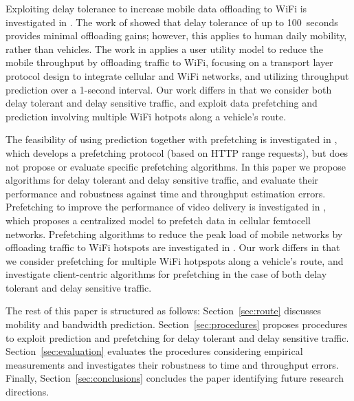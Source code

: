 \documentclass{sig-alternate}
\newcommand{\mynotex}[1]{}
\begin{document}
Exploiting  delay tolerance to increase   mobile data offloading to WiFi  is investigated in \cite{Bal++10}. The work of \cite{Lee++10} showed that delay tolerance of up to 100~seconds  provides minimal offloading gains; however, this applies to human daily mobility, rather than vehicles.
The work in \cite{Hou++11} applies a user utility model to reduce the mobile throughput by offloading traffic to WiFi, focusing on a transport layer protocol design to integrate cellular and WiFi networks, and utilizing throughput prediction over a 1-second  interval.
Our work differs in that we consider both delay tolerant and delay sensitive traffic, and exploit data prefetching and  prediction involving multiple WiFi hotpots along a vehicle's route.

The feasibility of using prediction together with prefetching is investigated in \cite{Des++09}, which  develops  a prefetching protocol (based on HTTP range requests), but does not propose or evaluate specific prefetching algorithms. In this paper we propose algorithms for delay tolerant and delay sensitive traffic, and evaluate their performance and robustness against time and throughput estimation errors.
Prefetching to improve the performance of video delivery  is investigated in \cite{Gol++12}, which proposes a centralized model to prefetch data in cellular femtocell networks. Prefetching algorithms to reduce the peak load of mobile networks by offloading traffic to WiFi hotspots are investigated in \cite{Mal++12}. Our work differs in that we consider prefetching for multiple WiFi hotpspots along a vehicle's route, and investigate client-centric algorithms for prefetching in the case of both delay tolerant and delay sensitive traffic.



The rest of this paper is structured as follows:
Section~\ref{sec:route} discusses mobility and bandwidth prediction.
Section~\ref{sec:procedures} proposes procedures to exploit prediction and prefetching for delay tolerant and delay sensitive traffic. Section~\ref{sec:evaluation} evaluates the procedures considering empirical measurements and investigates their robustness to  time and throughput errors. Finally, Section~\ref{sec:conclusions} concludes the paper identifying future research directions.



\mynotex{ Prior/related work on:
\begin{itemize}
\item Offloading of delay tolerant traffic
\item Wifi throughput prediction
\item Mobile throughput prediction, e.g. for streaming multimedia traffic.
\item Prefetching. In space-domain versus time-domain
\item mobile-WiFi handover not the focus of the paper.
\item also how prefetching can be implemented (http get) is discussed in \cite{Des++09}.
\end{itemize}
}
\end{document}
